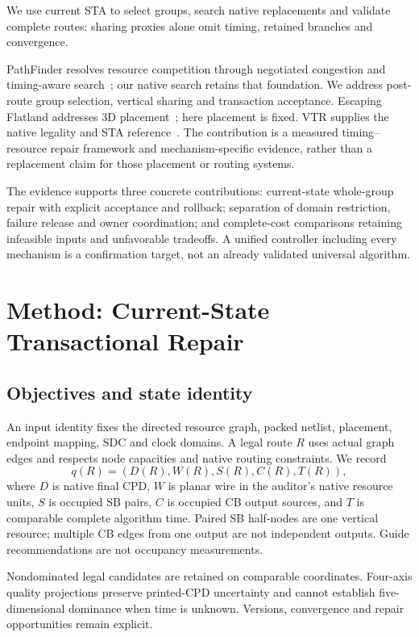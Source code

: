 \documentclass[conference,10pt]{IEEEtran}
\begin{document}
We use current STA to select groups, search native replacements and validate complete routes: sharing proxies alone omit timing, retained branches and convergence. 


PathFinder resolves resource competition through negotiated congestion and timing-aware search~\cite{pathfinder}; our native search retains that foundation. We address post-route group selection, vertical sharing and transaction acceptance. Escaping Flatland addresses 3D placement~\cite{flatland}; here placement is fixed. VTR supplies the native legality and STA reference~\cite{vtr9paper}. The contribution is a measured timing--resource repair framework and mechanism-specific evidence, rather than a replacement claim for those placement or routing systems.

The evidence supports three concrete contributions: current-state whole-group repair with explicit acceptance and rollback; separation of domain restriction, failure release and owner coordination; and complete-cost comparisons retaining infeasible inputs and unfavorable tradeoffs. A unified controller including every mechanism is a confirmation target, not an already validated universal algorithm.
\section{Method: Current-State Transactional Repair}
\subsection{Objectives and state identity}
An input identity fixes the directed resource graph, packed netlist, placement, endpoint mapping, SDC and clock domains. A legal route $R$ uses actual graph edges and respects node capacities and native routing constraints. We record
\begin{equation}
 q(R)=(D(R),W(R),S(R),C(R),T(R)),
\end{equation}
where $D$ is native final CPD, $W$ is planar wire in the auditor's native resource units, $S$ is occupied SB pairs, $C$ is occupied CB output sources, and $T$ is comparable complete algorithm time. Paired SB half-nodes are one vertical resource; multiple CB edges from one output are not independent outputs. Guide recommendations are not occupancy measurements.

Nondominated legal candidates are retained on comparable coordinates. Four-axis quality projections preserve printed-CPD uncertainty and cannot establish five-dimensional dominance when time is unknown. Versions, convergence and repair opportunities remain explicit.
\end{document}
